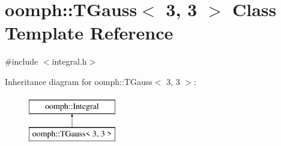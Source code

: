 \hypertarget{classoomph_1_1TGauss_3_013_00_013_01_4}{}\section{oomph\+:\+:T\+Gauss$<$ 3, 3 $>$ Class Template Reference}
\label{classoomph_1_1TGauss_3_013_00_013_01_4}


{\ttfamily \#include $<$integral.\+h$>$}

Inheritance diagram for oomph\+:\+:T\+Gauss$<$ 3, 3 $>$\+:\begin{figure}[H]
\begin{center}
\leavevmode
\includegraphics[height=2.000000cm]{classoomph_1_1TGauss_3_013_00_013_01_4}
\end{center}
\end{figure}
